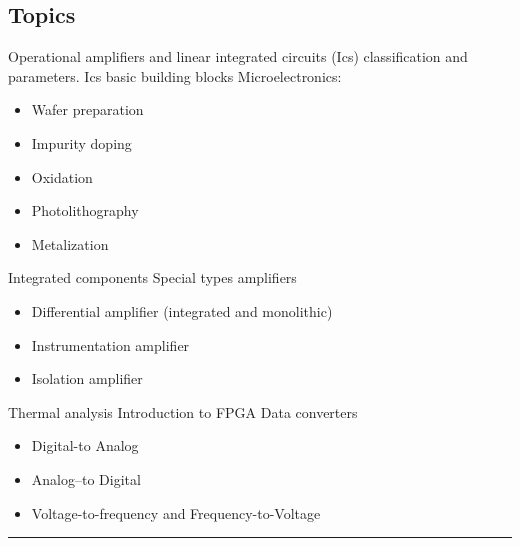 
\subsection*{Topics}
\begin{outline}
    \1 Operational amplifiers and linear integrated circuits (Ics) classification and parameters.
    \1 Ics basic building blocks
    \1 Microelectronics:
    \begin{itemize}
        \item Wafer preparation
        \item Impurity doping
        \item Oxidation
        \item Photolithography
        \item Metalization
    \end{itemize}
    \1 Integrated components
    \1 Special types amplifiers
    \begin{itemize}
        \item Differential amplifier (integrated and monolithic)
        \item Instrumentation amplifier
        \item Isolation amplifier
    \end{itemize}
    \1 Thermal analysis
    \1 Introduction to FPGA
    \1 Data converters
    \begin{itemize}
        \item Digital-to Analog
        \item Analog–to Digital
        \item Voltage-to-frequency and Frequency-to-Voltage
    \end{itemize}
\end{outline}
\vspace{2ex} \hrule\vspace{2ex}

